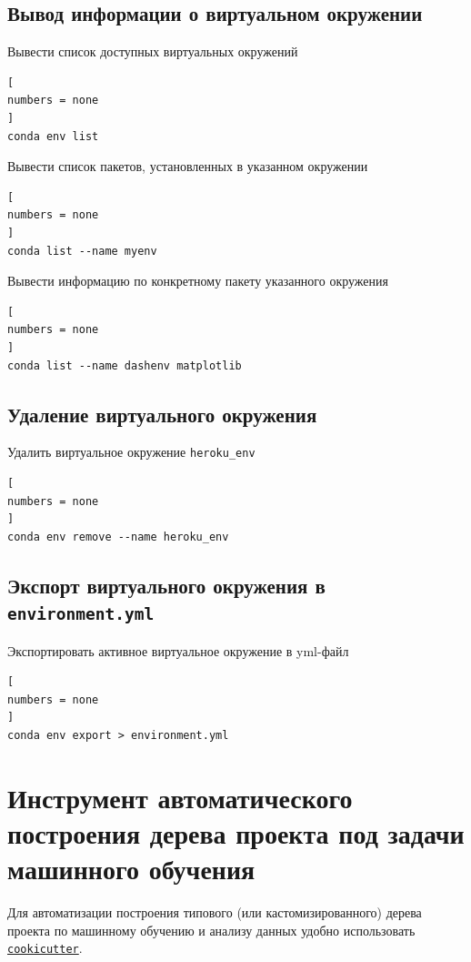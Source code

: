 \documentclass[%
	11pt,
	a4paper,
	utf8,
		]{article}
\begin{document}
\subsection{Вывод информации о виртуальном окружении}

Вывести список доступных виртуальных окружений

\begin{lstlisting}[
numbers = none
]
conda env list
\end{lstlisting}

Вывести список пакетов, установленных в указанном окружении

\begin{lstlisting}[
numbers = none
]
conda list --name myenv
\end{lstlisting}

Вывести информацию по конкретному пакету указанного окружения

\begin{lstlisting}[
numbers = none
]
conda list --name dashenv matplotlib
\end{lstlisting}


\subsection{Удаление виртуального окружения}

Удалить виртуальное окружение \texttt{heroku\_env}

\begin{lstlisting}[
numbers = none
]
conda env remove --name heroku_env
\end{lstlisting}

\subsection{Экспорт виртуального окружения в \texttt{environment.yml}}

Экспортировать активное виртуальное окружение в yml-файл

\begin{lstlisting}[
numbers = none
]
conda env export > environment.yml
\end{lstlisting}


\section{Инструмент автоматического построения дерева проекта под задачи машинного обучения}

Для автоматизации построения типового (или кастомизированного) дерева проекта по машинному обучению и анализу данных удобно использовать \href{https://cookiecutter.readthedocs.io/en/1.7.2/README.html}{\texttt{cookicutter}}.
\end{document}
